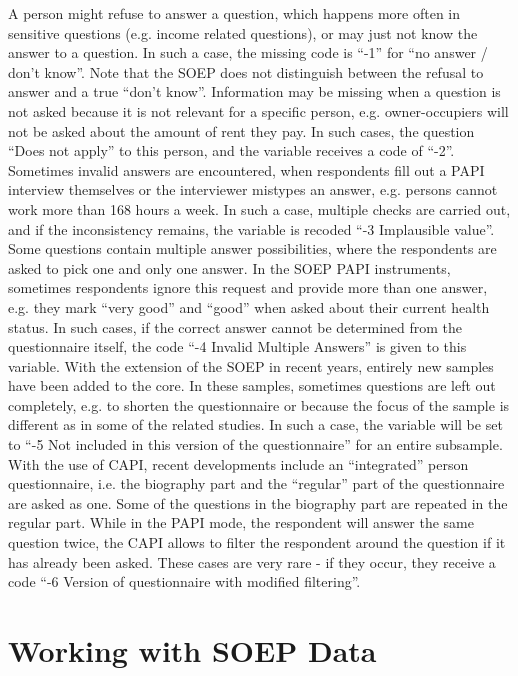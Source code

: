 \documentclass[letterpaper,10pt,openany,onesideH,english]{sphinxmanual}
\begin{document}
A person might refuse to answer a question, which happens more often in sensitive questions (e.g. income related questions), or may just not know the answer to a question. In such a case, the missing code is “-1” for “no answer / don’t know”. Note that the SOEP does not distinguish between the refusal to answer and a true “don’t know”. Information may be missing when a question is not asked because it is not relevant for a specific person, e.g. owner-occupiers will not be asked about the amount of rent they pay. In such cases, the question “Does not apply” to this person, and the variable receives a code of “-2”. Sometimes invalid answers are encountered, when respondents fill out a PAPI interview themselves or the interviewer mistypes an answer, e.g. persons cannot work more than 168 hours a week. In such a case, multiple checks are carried out, and if the inconsistency remains, the variable is recoded “-3 Implausible value”. Some questions contain multiple answer possibilities, where the respondents are asked to pick one and only one answer. In the SOEP PAPI instruments, sometimes respondents ignore this request and provide more than one answer, e.g. they mark “very good” and “good” when asked about their current health status. In such cases, if the correct answer cannot be determined from the questionnaire itself, the code “-4 Invalid Multiple Answers” is given to this variable. With the extension of the SOEP in recent years, entirely new samples have been added to the core. In these samples, sometimes questions are left out completely, e.g. to shorten the questionnaire or because the focus of the sample is different as in some of the related studies. In such a case, the variable will be set to “-5 Not included in this version of the questionnaire” for an entire subsample.
With the use of CAPI, recent developments include an “integrated” person questionnaire, i.e. the biography part and the “regular” part of the questionnaire are asked as one. Some of the questions in the biography part are repeated in the regular part. While in the PAPI mode, the respondent will answer the same question twice, the CAPI allows to filter the respondent around the question if it has already been asked. These cases are very rare - if they occur, they receive a code “-6 Version of questionnaire with modified filtering”.


\chapter{Working with SOEP Data}
\label{\detokenize{Working with SOEP Data/index:working-with-soep-data}}\label{\detokenize{Working with SOEP Data/index::doc}}
\end{document}

